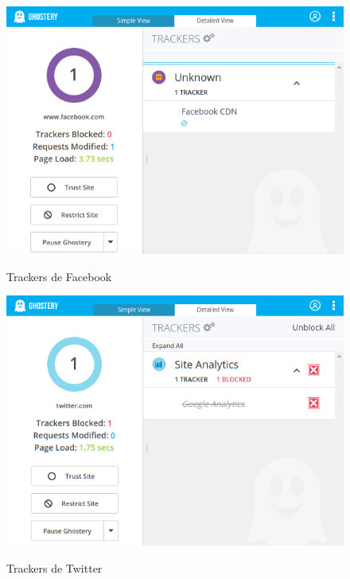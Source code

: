 \documentclass[10pt,a4paper]{article}
\begin{document}
\begin{figure}[H]
  \centering
  \includegraphics[scale=0.6]{ghost_fb.png}\\
  \caption{Trackers de Facebook}
  \label{fig:object}
\end{figure}

\begin{figure}[H]
  \centering
  \includegraphics[scale=0.6]{ghost_twitter.png}\\
  \caption{Trackers de Twitter}
  \label{fig:object}
\end{figure}
\end{document}
